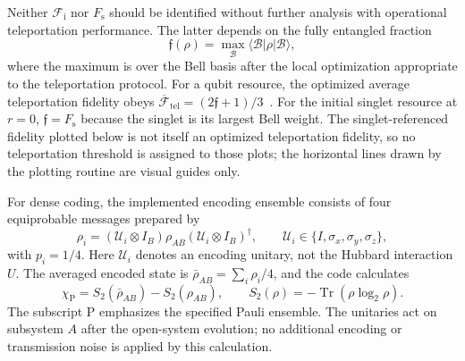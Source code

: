 \documentclass[aps,prb,twocolumn,superscriptaddress,longbibliography]{revtex4-2}
\begin{document}
Neither $\mathcal F_{\mathrm i}$ nor $F_{\mathrm s}$ should be identified
without further analysis with operational teleportation performance. The
latter depends on the fully entangled fraction
\begin{equation}\boxed{
\mathfrak f(\rho)=\max_{\mathcal B}\langle\mathcal B|\rho|\mathcal B\rangle,
}\end{equation}
where the maximum is over the Bell basis after the local optimization
appropriate to the teleportation protocol. For a qubit resource, the optimized
average teleportation fidelity obeys
$\overline{\mathcal F}_{\mathrm{tel}}=(2\mathfrak f+1)/3$~\cite{Horodecki1999}.
For the initial singlet resource at $r=0$, $\mathfrak f=F_{\mathrm s}$
because the singlet is its largest Bell weight. The singlet-referenced
fidelity plotted below is not itself an optimized teleportation fidelity,
so no teleportation threshold is assigned to those plots; the horizontal
lines drawn by the plotting routine are visual guides only.

For dense coding, the implemented encoding ensemble consists of four
equiprobable messages prepared by
\begin{equation}\boxed{
\rho_i=(\mathcal U_i\otimes I_B)\rho_{AB}
       (\mathcal U_i\otimes I_B)^\dagger,
\qquad
\mathcal U_i\in\{I,\sigma_x,\sigma_y,\sigma_z\},
}\end{equation}
with $p_i=1/4$. Here $\mathcal U_i$ denotes an encoding unitary, not the
Hubbard interaction $U$. The averaged encoded state is
$\bar\rho_{AB}=\sum_i\rho_i/4$, and the code calculates
\begin{equation}\boxed{
\chi_{\mathrm P}
=
S_2(\bar\rho_{AB})-S_2(\rho_{AB}),
\qquad
S_2(\rho)=-\operatorname{Tr}(\rho\log_2\rho).
}\label{eq:holevo_definition}\end{equation}
The subscript P emphasizes the specified Pauli ensemble. The unitaries act on
subsystem $A$ after the open-system evolution; no additional encoding or
transmission noise is applied by this calculation.
\end{document}
